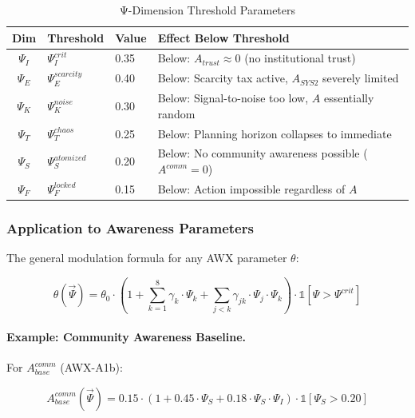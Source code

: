 \begin{table}[htbp]
\centering
\caption{Ψ-Dimension Threshold Parameters}
\label{tab:psi-thresholds}
\renewcommand{\arraystretch}{1.3}
\begin{tabular}{@{}cllp{6cm}@{}}
\toprule
\textbf{Dim} & \textbf{Threshold} & \textbf{Value} & \textbf{Effect Below Threshold} \\
\midrule
$\Psi_I$ & $\Psi_I^{crit}$ & 0.35 & Below: $A_{trust} \approx 0$ (no institutional trust) \\
$\Psi_E$ & $\Psi_E^{scarcity}$ & 0.40 & Below: Scarcity tax active, $A_{SYS2}$ severely limited \\
$\Psi_K$ & $\Psi_K^{noise}$ & 0.30 & Below: Signal-to-noise too low, $A$ essentially random \\
$\Psi_T$ & $\Psi_T^{chaos}$ & 0.25 & Below: Planning horizon collapses to immediate \\
$\Psi_S$ & $\Psi_S^{atomized}$ & 0.20 & Below: No community awareness possible ($A^{comm}=0$) \\
$\Psi_F$ & $\Psi_F^{locked}$ & 0.15 & Below: Action impossible regardless of $A$ \\
\bottomrule
\end{tabular}
\end{table}

\subsubsection{Application to Awareness Parameters}

The general modulation formula for any AWX parameter $\theta$:

\begin{equation}
\theta(\vec{\Psi}) = \theta_0 \cdot \left(1 + \sum_{k=1}^{8} \gamma_k \cdot \Psi_k + \sum_{j<k} \gamma_{jk} \cdot \Psi_j \cdot \Psi_k \right) \cdot \mathbb{1}[\Psi > \Psi^{crit}]
\end{equation}

\paragraph{Example: Community Awareness Baseline.}
For $A^{comm}_{base}$ (AWX-A1b):

\begin{equation}
A^{comm}_{base}(\vec{\Psi}) = 0.15 \cdot \left(1 + 0.45 \cdot \Psi_S + 0.18 \cdot \Psi_S \cdot \Psi_I \right) \cdot \mathbb{1}[\Psi_S > 0.20]
\end{equation}

